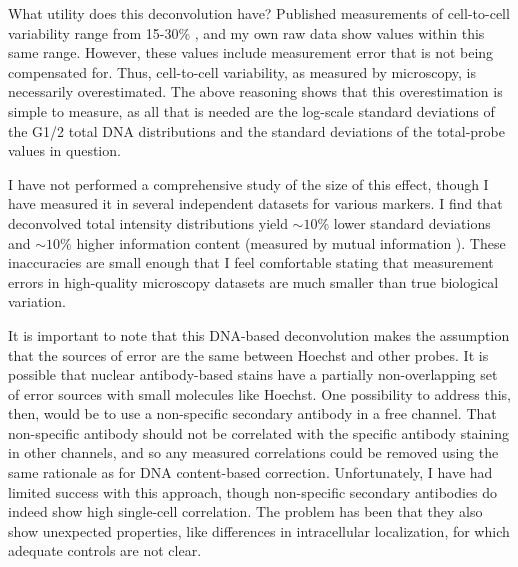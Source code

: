     
What utility does this deconvolution have? Published
measurements of cell-to-cell
variability range from 15-30\% \cite{Sigal2006a},
and my own raw data show values within
this same range. However, these values include measurement error
that is not being compensated for. Thus,
cell-to-cell variability, as measured by microscopy, is
necessarily overestimated. The above reasoning shows that
this overestimation is simple to measure, as all that is
needed are the log-scale standard deviations of the G1/2
total DNA distributions and the standard deviations of
the total-probe values in question.


I have not performed a comprehensive
study of the size of this effect, though I have measured it
in several independent datasets for various markers. I find
that deconvolved total intensity distributions yield
$\sim10\%$ lower standard deviations and $\sim10\%$ higher
information content (measured by mutual information \cite{Cheong2011}).
These inaccuracies are small enough that I feel comfortable
stating that measurement errors in high-quality microscopy datasets
are much smaller
than true biological variation.


It is important to note
that this DNA-based deconvolution makes the assumption
that the sources of error are the same between Hoechst and other probes. It is
possible that nuclear antibody-based stains have a partially non-overlapping
set of error sources with small molecules like Hoechst.
One possibility to address this, then, would be to use a
non-specific secondary antibody in a free channel.
That non-specific antibody should
not be correlated with the specific antibody staining in other
channels, and so any measured correlations could be removed using the
same rationale as for DNA content-based correction. Unfortunately,
I have had limited success with this
approach, though non-specific secondary antibodies
do indeed show high single-cell correlation. The problem has been that they also
show unexpected properties, like differences in intracellular
localization, for which adequate controls are not clear.

